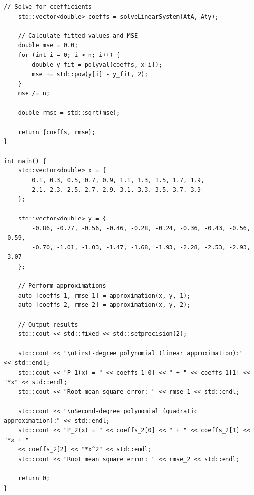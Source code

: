 \documentclass[14pt,a4paper]{extarticle}
\begin{document}
\begin{lstlisting}[caption={Файл Lab2.cpp}, label={lst:fullcode}]
	// Solve for coefficients
	std::vector<double> coeffs = solveLinearSystem(AtA, Aty);
	
	// Calculate fitted values and MSE
	double mse = 0.0;
	for (int i = 0; i < n; i++) {
		double y_fit = polyval(coeffs, x[i]);
		mse += std::pow(y[i] - y_fit, 2);
	}
	mse /= n;
	
	double rmse = std::sqrt(mse);
	
	return {coeffs, rmse};
}

int main() {
	std::vector<double> x = {
		0.1, 0.3, 0.5, 0.7, 0.9, 1.1, 1.3, 1.5, 1.7, 1.9,
		2.1, 2.3, 2.5, 2.7, 2.9, 3.1, 3.3, 3.5, 3.7, 3.9
	};
	
	std::vector<double> y = {
		-0.86, -0.77, -0.56, -0.46, -0.28, -0.24, -0.36, -0.43, -0.56, -0.59,
		-0.70, -1.01, -1.03, -1.47, -1.68, -1.93, -2.28, -2.53, -2.93, -3.07
	};
	
	// Perform approximations
	auto [coeffs_1, rmse_1] = approximation(x, y, 1);
	auto [coeffs_2, rmse_2] = approximation(x, y, 2);
	
	// Output results
	std::cout << std::fixed << std::setprecision(2);
	
	std::cout << "\nFirst-degree polynomial (linear approximation):" << std::endl;
	std::cout << "P_1(x) = " << coeffs_1[0] << " + " << coeffs_1[1] << "*x" << std::endl;
	std::cout << "Root mean square error: " << rmse_1 << std::endl;
	
	std::cout << "\nSecond-degree polynomial (quadratic approximation):" << std::endl;
	std::cout << "P_2(x) = " << coeffs_2[0] << " + " << coeffs_2[1] << "*x + "
	<< coeffs_2[2] << "*x^2" << std::endl;
	std::cout << "Root mean square error: " << rmse_2 << std::endl;
	
	return 0;
}
	\end{lstlisting}
	
\end{document}
